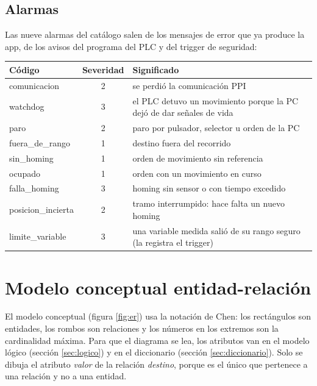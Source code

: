 \documentclass[a4paper,11pt]{article}
\begin{document}
\subsection{Alarmas}
Las nueve alarmas del catálogo salen de los mensajes de error que ya produce la app, de los avisos del programa del PLC y del trigger de seguridad:
\begin{center}\small
\begin{tabular}{>{\ttfamily}l c l}
\toprule
\textrm{\textbf{Código}} & \textbf{Severidad} & \textbf{Significado}\\
\midrule
comunicacion & 2 & se perdió la comunicación PPI\\
watchdog & 3 & el PLC detuvo un movimiento porque la PC dejó de dar señales de vida\\
paro & 2 & paro por pulsador, selector u orden de la PC\\
fuera\_de\_rango & 1 & destino fuera del recorrido\\
sin\_homing & 1 & orden de movimiento sin referencia\\
ocupado & 1 & orden con un movimiento en curso\\
falla\_homing & 3 & homing sin sensor o con tiempo excedido\\
posicion\_incierta & 2 & tramo interrumpido: hace falta un nuevo homing\\
limite\_variable & 3 & una variable medida salió de su rango seguro (la registra el trigger)\\
\bottomrule
\end{tabular}
\end{center}

\section{Modelo conceptual entidad-relación}\label{sec:er}

El modelo conceptual (figura \ref{fig:er}) usa la notación de Chen: los rectángulos son entidades, los rombos son relaciones y los números en los extremos son la cardinalidad máxima. Para que el diagrama se lea, los atributos van en el modelo lógico (sección \ref{sec:logico}) y en el diccionario (sección \ref{sec:diccionario}). Solo se dibuja el atributo \emph{valor} de la relación \emph{destino}, porque es el único que pertenece a una relación y no a una entidad.
\end{document}

